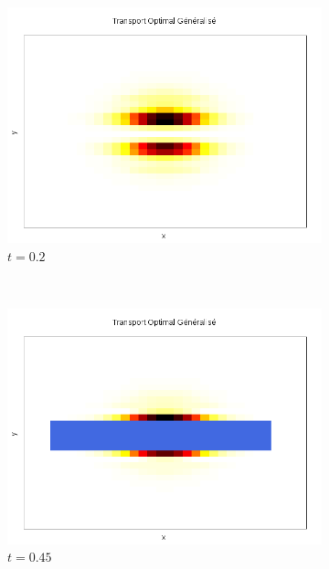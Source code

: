 \documentclass[a4paper,12pt]{article}
\begin{document}
\begin{figure}[!h]
\begin{subfigure}[b]{0.18\linewidth}
\includegraphics[width=\linewidth]{img/2DObstacle/T_00007.png}
\caption{$t=0.2$}
\end{subfigure}
~
\begin{subfigure}[b]{0.18\linewidth}
\includegraphics[width=\linewidth]{img/2DObstacle/T_00014.png}
\caption{$t=0.45$}
\end{subfigure}
~
\begin{subfigure}[b]{0.18\linewidth}

\end{subfigure}
\end{figure}
\end{document}
